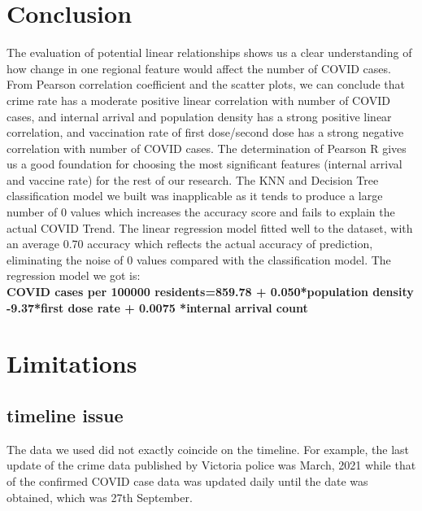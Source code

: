\documentclass[a4, 11pt]{article}
\begin{document}
\section{Conclusion}
The evaluation of potential linear relationships shows us a clear understanding of how change in one regional feature would affect the number of COVID cases. From Pearson correlation coefficient and the scatter plots, we can conclude that crime rate has a moderate positive linear correlation with number of COVID cases, and internal arrival and population density has a strong positive linear correlation, and vaccination rate of first dose/second dose has a strong negative correlation with number of COVID cases. The determination of Pearson R gives us a good foundation for choosing the most significant features (internal arrival and vaccine rate) for the rest of our research.
The KNN and Decision Tree classification model we built was inapplicable as it tends to produce a large number of 0 values which increases the accuracy score and fails to explain the actual COVID Trend.
The linear regression model fitted well to the dataset, with an average 0.70 accuracy which reflects the actual accuracy of prediction, eliminating the noise of 0 values compared with the classification model.
The regression model we got is:
\\
\textbf{COVID cases per 100000 residents=859.78 + 0.050*population density -9.37*first dose rate + 0.0075 *internal arrival count}


\section{Limitations}
\subsection{timeline issue}
The data we used did not exactly coincide on the timeline. For example, the last update of the crime data published by Victoria police was March, 2021 while that of the confirmed COVID case data was updated daily until the date was obtained, which was 27th September.
\end{document}

